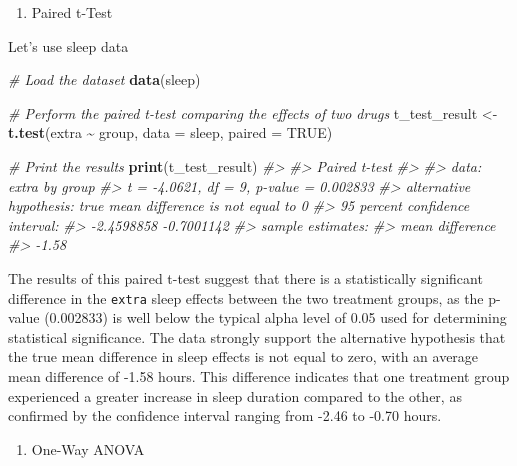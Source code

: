\documentclass[
]{book}
\newenvironment{Shaded}{\begin{snugshade}}{\end{snugshade}}
\newcommand{\AttributeTok}[1]{\textcolor[rgb]{0.13,0.29,0.53}{#1}}
\newcommand{\CommentTok}[1]{\textcolor[rgb]{0.56,0.35,0.01}{\textit{#1}}}
\newcommand{\ConstantTok}[1]{\textcolor[rgb]{0.56,0.35,0.01}{#1}}
\newcommand{\FunctionTok}[1]{\textcolor[rgb]{0.13,0.29,0.53}{\textbf{#1}}}
\newcommand{\NormalTok}[1]{#1}
\newcommand{\OtherTok}[1]{\textcolor[rgb]{0.56,0.35,0.01}{#1}}
\newcommand{\SpecialCharTok}[1]{\textcolor[rgb]{0.81,0.36,0.00}{\textbf{#1}}}
\providecommand{\tightlist}{%
  \setlength{\itemsep}{0pt}\setlength{\parskip}{0pt}}
\begin{document}
\begin{enumerate}
\def\labelenumi{\alph{enumi}.}
\setcounter{enumi}{2}
\tightlist
\item
  Paired t-Test
\end{enumerate}

Let's use sleep data

\begin{Shaded}
\begin{Highlighting}[]
\CommentTok{\# Load the dataset}
\FunctionTok{data}\NormalTok{(sleep)}

\CommentTok{\# Perform the paired t{-}test comparing the effects of two drugs}
\NormalTok{t\_test\_result }\OtherTok{\textless{}{-}} \FunctionTok{t.test}\NormalTok{(extra }\SpecialCharTok{\textasciitilde{}}\NormalTok{ group, }\AttributeTok{data =}\NormalTok{ sleep, }\AttributeTok{paired =} \ConstantTok{TRUE}\NormalTok{)}

\CommentTok{\# Print the results}
\FunctionTok{print}\NormalTok{(t\_test\_result)}
\CommentTok{\#\textgreater{} }
\CommentTok{\#\textgreater{}  Paired t{-}test}
\CommentTok{\#\textgreater{} }
\CommentTok{\#\textgreater{} data:  extra by group}
\CommentTok{\#\textgreater{} t = {-}4.0621, df = 9, p{-}value = 0.002833}
\CommentTok{\#\textgreater{} alternative hypothesis: true mean difference is not equal to 0}
\CommentTok{\#\textgreater{} 95 percent confidence interval:}
\CommentTok{\#\textgreater{}  {-}2.4598858 {-}0.7001142}
\CommentTok{\#\textgreater{} sample estimates:}
\CommentTok{\#\textgreater{} mean difference }
\CommentTok{\#\textgreater{}           {-}1.58}
\end{Highlighting}
\end{Shaded}

The results of this paired t-test suggest that there is a statistically significant difference in the \texttt{extra} sleep effects between the two treatment groups, as the p-value (0.002833) is well below the typical alpha level of 0.05 used for determining statistical significance. The data strongly support the alternative hypothesis that the true mean difference in sleep effects is not equal to zero, with an average mean difference of -1.58 hours. This difference indicates that one treatment group experienced a greater increase in sleep duration compared to the other, as confirmed by the confidence interval ranging from -2.46 to -0.70 hours.

\begin{enumerate}
\def\labelenumi{\alph{enumi}.}
\setcounter{enumi}{3}
\tightlist
\item
  One-Way ANOVA
\end{enumerate}
\end{document}
